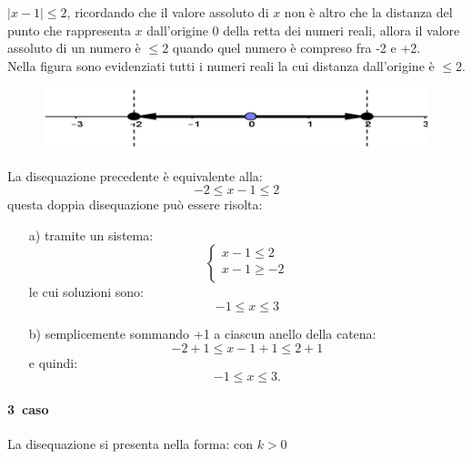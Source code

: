 \begin{esempio}  \(|x-1|\leq 2\), ricordando che il valore 
assoluto di \(x\) non è altro che la distanza del punto che rappresenta 
\(x\) dall'origine 0 della retta dei numeri reali, allora il valore assoluto di 
un 
numero è \(\leq 2\) quando quel numero è compreso fra -2 e +2.\\
        Nella figura sono evidenziati tutti i numeri reali la cui distanza 
dall'origine è \(\leq 2\).

\begin{figure}[h]
\begin{center}
\begin{inaccessibleblock}[TODO]
\centering
\includegraphics[width=0.5\linewidth]{img/imm4} %
\end{inaccessibleblock}
\label{fig:abs_imm4}
\end{center}
\end{figure}

La disequazione precedente è equivalente alla:
\[-2\leq x-1 \leq 2\]
questa doppia disequazione può essere risolta:
\begin{enumerate}
  \item [a)] tramite un sistema:
    \[
    \left\lbrace 
    \begin{array}{l}
    x-1\leq 2\\
    x-1\geq -2\\
    \end{array}
    \right.
    \]
    le cui soluzioni sono:
    \[-1\leq x \leq 3\]
  \item [b)] semplicemente sommando +1 a ciascun anello della catena:
    \[-2+1\leq x-1+1 \leq 2+1\]
    e quindi:
    \[-1\leq x \leq 3.\]
\end{enumerate}
\end{esempio}

\paragraph{3\textdegree~caso} La disequazione si presenta nella forma:  
 con \(k> 0\)\\

